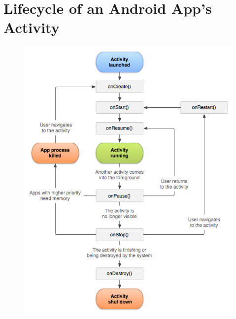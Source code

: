 \chapter{Lifecycle of an Android App's Activity\cite{androidlife}}

\begin{figure}
	\centering
		\includegraphics{input/images/activity_lifecycle.png}
	\label{fig:activity_lifecycle}
	\label{The LifeCyle of an Android App's Activity.}
\end{figure}

